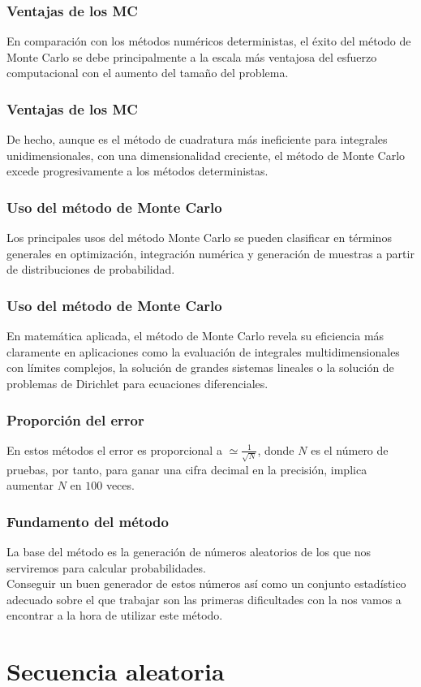 \begin{frame}
\frametitle{Ventajas de los MC}
En comparación con los métodos numéricos deterministas, el éxito del método de Monte Carlo se debe principalmente a la escala más ventajosa del esfuerzo computacional con el aumento del tamaño del problema.
\end{frame}
\begin{frame}
\frametitle{Ventajas de los MC}
De hecho, aunque es el método de cuadratura más ineficiente para integrales unidimensionales, con una dimensionalidad creciente, el método de Monte Carlo excede progresivamente a los métodos deterministas.
\end{frame}
\begin{frame}
\frametitle{Uso del método de Monte Carlo}
Los principales usos del método Monte Carlo se pueden clasificar en términos generales en optimización, integración numérica y generación de muestras a partir de distribuciones de probabilidad.
\end{frame}
\begin{frame}
\frametitle{Uso del método de Monte Carlo}
En matemática aplicada, el método de Monte Carlo revela su eficiencia más claramente en aplicaciones como la evaluación de integrales multidimensionales con límites complejos, la solución de grandes sistemas lineales o la solución de problemas de Dirichlet para ecuaciones diferenciales.
\end{frame}
\begin{frame}
\frametitle{Proporción del error}
En estos métodos el error es proporcional a $\simeq \frac{1}{\sqrt{N}}$, donde $N$ es el número de pruebas, por tanto, para ganar una cifra decimal en la precisión, implica aumentar $N$ en $100$ veces.
\end{frame}
\begin{frame}
\frametitle{Fundamento del método}
La base del método es la generación de números aleatorios de los que nos serviremos para calcular probabilidades.
\\
\bigskip
Conseguir un buen generador de estos números así como un conjunto estadístico adecuado sobre el que trabajar son las primeras dificultades con la nos vamos a encontrar a la hora de utilizar este método.
\end{frame}
\section{Secuencia aleatoria}
